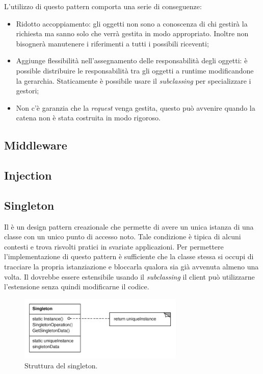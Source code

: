 	L'utilizzo di questo pattern comporta una serie di conseguenze:
		\begin{itemize}
			\item Ridotto accoppiamento: gli oggetti non sono a conoscenza di chi gestirà la richiesta ma sanno solo che verrà gestita in modo appropriato. Inoltre non bisognerà manutenere i riferimenti a tutti i possibili riceventi;
			\item Aggiunge flessibilità nell'assegnamento delle responsabilità degli oggetti: è possible distribuire le responsabilità tra gli oggetti a runtime modificandone la gerarchia. Staticamente è possibile usare il \emph{subclassing} per specializzare i gestori;
 			\item Non c'è garanzia che la \emph{request} venga gestita, questo può avvenire quando la catena non è stata costruita in modo rigoroso.
		\end{itemize}
	
		
	
	\subsection{Middleware} 
	
	\subsection{Injection} %
	
	\subsection{Singleton} %
	Il  è un design pattern creazionale che permette di avere un unica istanza di una classe con un unico punto di accesso noto. Tale condizione è tipica di alcuni contesti e trova risvolti pratici in svariate applicazioni. Per permettere l'implementazione di questo pattern è sufficiente che la classe stessa si occupi di tracciare la propria istanziazione e bloccarla qualora sia già avvenuta almeno una volta. Il  dovrebbe essere estensibile usando il \emph{subclassing} il client può utilizzarne l'estensione senza quindi modificarne il codice.
	
		\begin{figure}[h]
	\centering \includegraphics[width=0.7\textwidth]{patterns/Singleton.png}
	\caption{Struttura del singleton.}
	\label{fig:chainofresponsibility}
	\end{figure}
	
